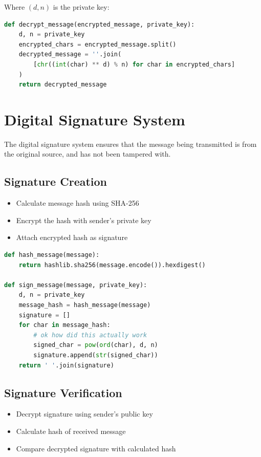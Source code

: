 \documentclass[12pt,a4paper]{report}
\begin{document}
Where $(d,n)$ is the private key:

\begin{lstlisting}[language=Python, caption=Message Decryption Function]
def decrypt_message(encrypted_message, private_key):
    d, n = private_key
    encrypted_chars = encrypted_message.split()
    decrypted_message = ''.join(
        [chr((int(char) ** d) % n) for char in encrypted_chars]
    )
    return decrypted_message
\end{lstlisting}

\section{Digital Signature System}
The digital signature system ensures that the message being transmitted is from the original source, and has not been tampered with.

\subsection{Signature Creation}
\begin{itemize}
\item Calculate message hash using SHA-256
\item Encrypt the hash with sender's private key
\item Attach encrypted hash as signature
\end{itemize}

\begin{lstlisting}[language=Python, caption=Signature Creation]
def hash_message(message):
    return hashlib.sha256(message.encode()).hexdigest()

def sign_message(message, private_key):
    d, n = private_key
    message_hash = hash_message(message)
    signature = []
    for char in message_hash:
        # ok how did this actually work
        signed_char = pow(ord(char), d, n)
        signature.append(str(signed_char))
    return ' '.join(signature)
\end{lstlisting}

\subsection{Signature Verification}
\begin{itemize}
\item Decrypt signature using sender's public key
\item Calculate hash of received message
\item Compare decrypted signature with calculated hash
\end{itemize}
\end{document}
